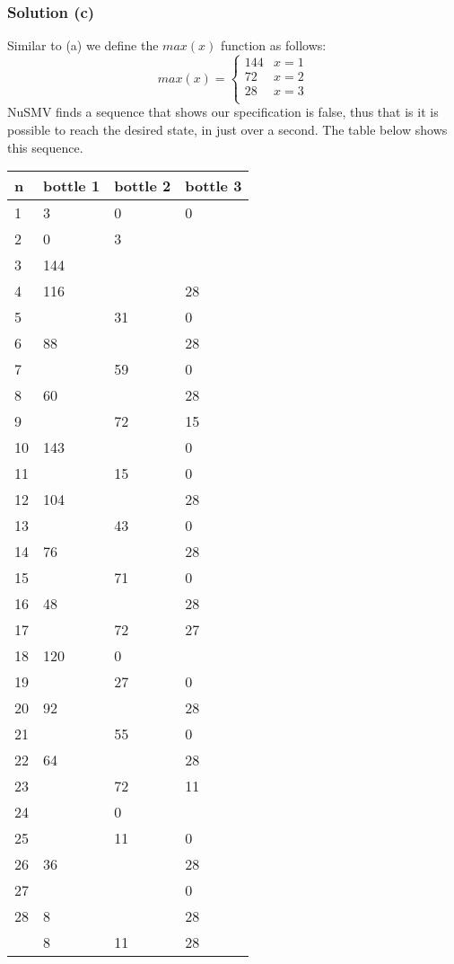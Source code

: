 \documentclass[12pt]{article}
\begin{document}
\subsubsection*{Solution (c)}
Similar to (a) we define the $max(x)$ function as follows:
\begin{equation*}
max(x) = 
	\begin{cases}
		144 & x = 1\\  
		72 	& x = 2\\  
		28	& x = 3\\  
	\end{cases}
\end{equation*}
NuSMV finds a sequence that shows our specification is false, thus that is it is
possible to reach the desired state, in just over a second. The table below 
shows this sequence.

\begin{tabular}{|l|l|l|l|}
	\hline	
	n & bottle 1	& bottle 2 	& bottle 3 	\\  
	\hline \hline
	1 & 3	& 0		& 0 \\  
	2 & 0	& 3		&   \\  
	3 & 144	& 		&	 \\  
	4 & 116 & 		& 28 \\  
	5 &  	& 31 	& 0 \\  
	6 & 88 	& 		& 28 \\  
	7 & 	& 59	& 0 \\  
	8 & 60	& 		& 28 \\  
	9 & 	& 72	& 15 \\  
	10& 143	&		& 0 \\  
	11& 	& 15	& 0 \\  
	12& 104	&		& 28 \\  
	13& 	& 43	& 0	\\  
	14& 76	& 		& 28 \\  
	15&		& 71	& 0 \\  
	16& 48	& 		& 28 \\
	17&		& 72	& 27 \\  
	18& 120 & 0		&  \\  
	19& 	& 27	& 0 \\  
	20& 92	& 		& 28 \\  
	21&		& 55 	& 0 \\  
	22& 64	& 		& 28 \\  
	23& 	& 72	& 11 \\  
	24& 	& 0		&	\\  
	25&		& 11	& 0 \\  
	26& 36	&		& 28 \\  
	27& 	&		& 0 \\  
	28& 8	&		& 28 \\  
	\hline
	  & 8	& 11	& 28 \\  
	\hline
\end{tabular}
\end{document}
